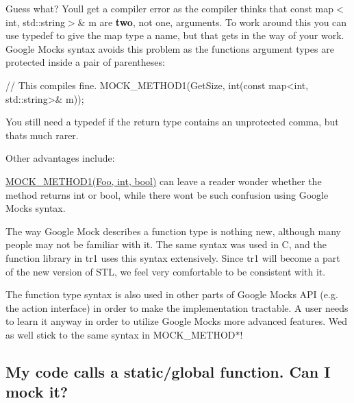 Guess what? You\textquotesingle{}ll get a compiler error as the compiler thinks that {\ttfamily const map$<$int, std\+::string$>$\& m} are {\bfseries two}, not one, arguments. To work around this you can use {\ttfamily typedef} to give the map type a name, but that gets in the way of your work. Google Mock\textquotesingle{}s syntax avoids this problem as the function\textquotesingle{}s argument types are protected inside a pair of parentheses\+: 
\begin{DoxyCode}
// This compiles fine.
MOCK\_METHOD1(GetSize, int(const map<int, std::string>& m));
\end{DoxyCode}


You still need a {\ttfamily typedef} if the return type contains an unprotected comma, but that\textquotesingle{}s much rarer.

Other advantages include\+:
\begin{DoxyEnumerate}
\item {\ttfamily \hyperlink{gmock-generated-function-mockers_8h_ac49d366be035ee87b73264a29059cdc7}{M\+O\+C\+K\+\_\+\+M\+E\+T\+H\+O\+D1(\+Foo, int, bool)}} can leave a reader wonder whether the method returns {\ttfamily int} or {\ttfamily bool}, while there won\textquotesingle{}t be such confusion using Google Mock\textquotesingle{}s syntax.
\end{DoxyEnumerate}
\begin{DoxyEnumerate}
\item The way Google Mock describes a function type is nothing new, although many people may not be familiar with it. The same syntax was used in C, and the {\ttfamily function} library in {\ttfamily tr1} uses this syntax extensively. Since {\ttfamily tr1} will become a part of the new version of S\+TL, we feel very comfortable to be consistent with it.
\end{DoxyEnumerate}
\begin{DoxyEnumerate}
\item The function type syntax is also used in other parts of Google Mock\textquotesingle{}s A\+PI (e.\+g. the action interface) in order to make the implementation tractable. A user needs to learn it anyway in order to utilize Google Mock\textquotesingle{}s more advanced features. We\textquotesingle{}d as well stick to the same syntax in {\ttfamily M\+O\+C\+K\+\_\+\+M\+E\+T\+H\+O\+D$\ast$}!
\end{DoxyEnumerate}

\subsection*{My code calls a static/global function. Can I mock it?}

